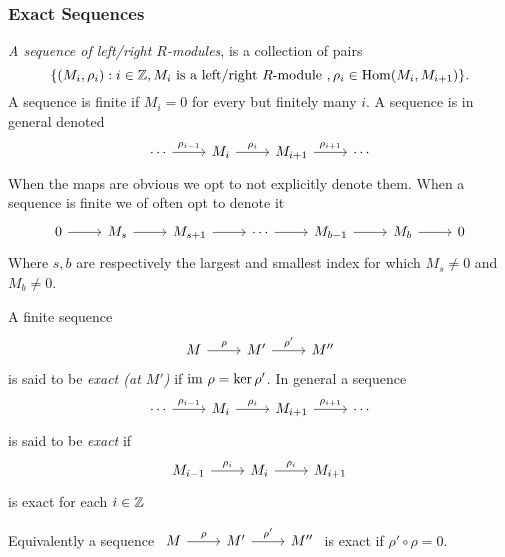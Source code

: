 \subsubsection{Exact Sequences}
    \begin{definition}
        \textit{A sequence of left/right $R$-modules}, is a collection of pairs $$\{(M_i,\rho_i) : i\in \mathbb{Z}, M_i \text{ is a left/right } R\text{-module }, \rho_i\in \mathrm{Hom}(M_i,M_{i+1})\}.$$ A sequence is finite if $M_i=0$ for every but finitely many $i$. A sequence is in general denoted
        $$\begin{tikzcd}
            \cdots \arrow[r, "\rho_{i-1}"]  & M_i \arrow[r, "\rho_{i}"]  & M_{i+1} \arrow[r, "\rho_{i+1}"] & \cdots
        \end{tikzcd}$$
        When the maps are obvious we opt to not explicitly denote them. When a sequence is finite we of often opt to denote it
        $$\begin{tikzcd}
            0 \arrow[r] & M_s \arrow[r] & M_{s+1} \arrow[r] & \cdots \arrow[r] & M_{b-1}\arrow[r] & M_b \arrow[r] & 0
        \end{tikzcd}$$
        Where $s,b$ are respectively the largest and smallest index for which $M_s\neq 0$ and $M_b\neq 0$.
    \end{definition}
    \begin{definition}
        A finite sequence
        $$\begin{tikzcd}
            M \arrow[r,"\rho"] & M' \arrow[r,"\rho'"] & M''
        \end{tikzcd}$$
        is said to be \textit{exact (at $M'$)} if $\mathrm{im} \ \rho = \ker \rho'$.
        In general a sequence 
         $$\begin{tikzcd}
            \cdots \arrow[r, "\rho_{i-1}"]  & M_i \arrow[r, "\rho_{i}"]  & M_{i+1} \arrow[r, "\rho_{i+1}"] & \cdots
        \end{tikzcd}$$
        is said to be \textit{exact} if 
        $$\begin{tikzcd}
            M_{i-1} \arrow[r,"\rho_i"] & M_i \arrow[r,"\rho_{i}"] & M_{i+1} 
        \end{tikzcd}$$
        is exact for each $i\in \mathbb{Z}$
    \end{definition}
    \begin{remark}
        Equivalently a sequence $\begin{tikzcd} M\arrow[r,"\rho"] & M' \arrow[r,"\rho'"] & M'' \end{tikzcd}$ is exact if $\rho'\circ \rho =0$.
    \end{remark}
